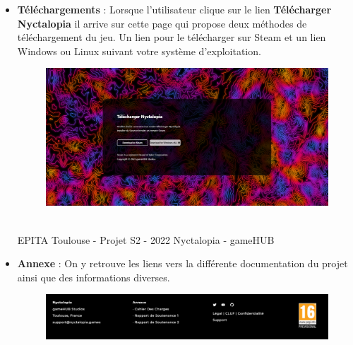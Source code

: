\begin{itemize}
    \item \textbf{Téléchargements} : Lorsque l'utilisateur clique sur le lien \textbf{Télécharger Nyctalopia} il arrive sur cette page qui propose deux méthodes de téléchargement du jeu. Un lien pour le télécharger sur Steam et un lien Windows ou Linux suivant votre système d'exploitation.
    \newline

\begin{figure}[H]
\centering
\begin{minipage}{.5\textwidth}
  \centering
  \centerline{\includegraphics[width=1\linewidth]{img/7.PNG}}
  \label{fig:faq}
\end{minipage}%
\end{figure}


\vfill
\noindent\makebox[\linewidth]{\rule{.8\paperwidth}{.6pt}}\\[0.2cm]
EPITA Toulouse - Projet S2 - 2022 \hfill Nyctalopia - gameHUB
\noindent\makebox[\linewidth]{\rule{.8\paperwidth}{.6pt}}
\newpage


    \item \textbf{Annexe} : On y retrouve les liens vers la différente documentation du projet ainsi que des informations diverses.
    
\begin{figure}[H]
\centering
\begin{minipage}{.5\textwidth}
  \centering
  \centerline{\includegraphics[width=1\linewidth]{img/uwufolder/annexe.png}}
  \label{fig:faq}
\end{minipage}%
\end{figure}
\end{itemize}
\newline

